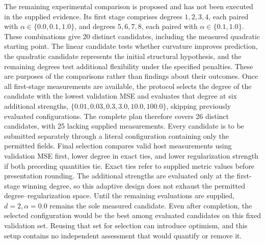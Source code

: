 \documentclass[11pt]{article}
\begin{document}
The remaining experimental comparison is proposed and has not been executed in the supplied evidence. Its first stage comprises degrees \(1,2,3,4\), each paired with \(\alpha\in\{0.0,0.1,1.0\}\), and degrees \(5,6,7,8\), each paired with \(\alpha\in\{0.1,1.0\}\). These combinations give 20 distinct candidates, including the measured quadratic starting point. The linear candidate tests whether curvature improves prediction, the quadratic candidate represents the initial structural hypothesis, and the remaining degrees test additional flexibility under the specified penalties. These are purposes of the comparisons rather than findings about their outcomes. Once all first-stage measurements are available, the protocol selects the degree of the candidate with the lowest validation MSE and evaluates that degree at six additional strengths, \(\{0.01,0.03,0.3,3.0,10.0,100.0\}\), skipping previously evaluated configurations. The complete plan therefore covers 26 distinct candidates, with 25 lacking supplied measurements. Every candidate is to be submitted separately through a literal configuration containing only the permitted fields. Final selection compares valid host measurements using validation MSE first, lower degree in exact ties, and lower regularization strength if both preceding quantities tie. Exact ties refer to supplied metric values before presentation rounding. The additional strengths are evaluated only at the first-stage winning degree, so this adaptive design does not exhaust the permitted degree--regularization space. Until the remaining evaluations are supplied, \(d=2,\alpha=0.0\) remains the sole measured candidate. Even after completion, the selected configuration would be the best among evaluated candidates on this fixed validation set. Reusing that set for selection can introduce optimism, and this setup contains no independent assessment that would quantify or remove it.
\end{document}
